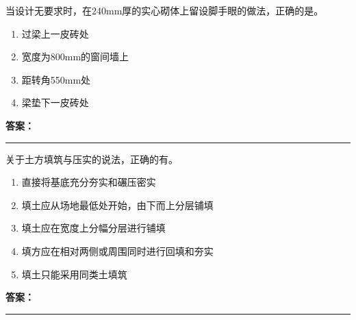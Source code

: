 \documentclass[UTF8,fontset=fandol,11pt]{ctexart}
\newcommand{\answerline}{\textcolor{answerred}{\rule{2.4cm}{0.7pt}}}
\begin{document}
\begin{quizbox}[title={乱序第 95 题｜第六章砌筑工程}]

当设计无要求时，在240mm厚的实心砌体上留设脚手眼的做法，正确的是。\\

\begin{enumerate}[label=\Alph*.]

\item 过梁上一皮砖处

\item 宽度为800mm的窗间墙上

\item 距转角550mm处

\item 梁垫下一皮砖处

\end{enumerate}

\textbf{\textcolor{answerred}{答案：}} \answerline

\end{quizbox}

\vspace{0.2em}

\begin{quizbox}[title={乱序第 96 题｜第一章土方工程}]

关于土方填筑与压实的说法，正确的有。\\

\begin{enumerate}[label=\Alph*.]

\item 直接将基底充分夯实和碾压密实

\item 填土应从场地最低处开始，由下而上分层铺填

\item 填土应在宽度上分幅分层进行铺填

\item 填方应在相对两侧或周围同时进行回填和夯实

\item 填土只能采用同类土填筑

\end{enumerate}

\textbf{\textcolor{answerred}{答案：}} \answerline

\end{quizbox}

\vspace{0.2em}
\end{document}
